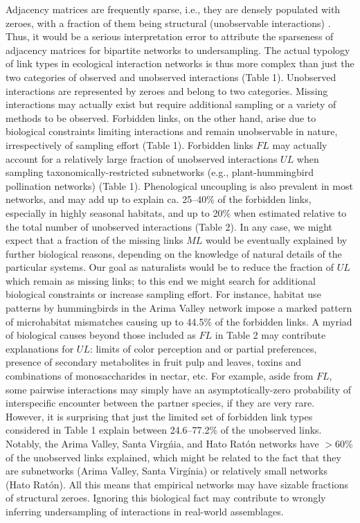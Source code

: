 \documentclass[12pt]{article}
\begin{document}
Adjacency matrices are frequently sparse, i.e., they are densely populated with zeroes, with a fraction of them being structural (unobservable interactions) \citep{Bascompte:2014to}. Thus, it would be a serious interpretation error to attribute the sparseness of adjacency matrices for bipartite networks to undersampling. The actual typology of link types in ecological interaction networks is thus more complex than just the two categories of observed and unobserved interactions (Table 1). Unobserved interactions are represented by zeroes and belong to two categories. Missing interactions may actually exist but require additional sampling or a variety of methods to be observed. Forbidden links, on the other hand, arise due to biological constraints limiting interactions and remain unobservable in nature, irrespectively of sampling effort (Table 1). Forbidden links $FL$ may actually account for a relatively large fraction of unobserved interactions $UL$ when sampling taxonomically-restricted subnetworks (e.g., plant-hummingbird pollination networks) (Table 1). Phenological uncoupling is also prevalent in most networks, and may add up to explain ca. 25--40\% of the forbidden links, especially in highly seasonal habitats, and up to 20\% when estimated relative to the total number of unobserved interactions (Table 2). In any case, we might expect that a fraction of the missing links $ML$ would be eventually explained by further biological reasons, depending on the knowledge of natural details of the particular systems. Our goal as naturalists would be to reduce the fraction of $UL$ which remain as missing links; to this end we might search for additional biological constraints or increase sampling effort. For instance, habitat use patterns by hummingbirds in the Arima Valley network \citep[Table 2; ][]{E31.616} impose a marked pattern of microhabitat mismatches causing up to 44.5\% of the forbidden links. A myriad of biological causes beyond those included as $FL$ in Table 2 may contribute explanations for $UL$: limits of color perception and or partial preferences, presence of secondary metabolites in fruit pulp and leaves, toxins and combinations of monosaccharides in nectar, etc. For example, aside from $FL$, some pairwise interactions may simply have an asymptotically-zero probability of interspecific encounter between the partner species, if they are very rare. However, it is surprising that just the limited set of forbidden link types considered in Table 1 explain between 24.6--77.2\% of the unobserved links. Notably, the Arima Valley, Santa Virg\'nia, and Hato Rat\'on networks have $>60\%$ of the unobserved links explained, which might be related to the fact that they are subnetworks (Arima Valley, Santa Virg\'inia) or relatively small networks (Hato Rat\'on). All this means that empirical networks may have sizable fractions of structural zeroes. Ignoring this biological fact may contribute to wrongly inferring undersampling of interactions in real-world assemblages.
\end{document}
